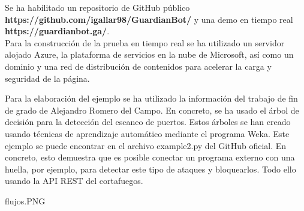 Se ha habilitado un repositorio de GitHub público \textbf{https://github.com/igallar98/GuardianBot/} y una demo en tiempo real \textbf{https://guardianbot.ga/}.
\\Para la construcción de la prueba en tiempo real se ha utilizado un servidor alojado Azure, la plataforma de servicios en la nube de Microsoft, así como un dominio y una red de distribución de contenidos para acelerar la carga y seguridad de la página. 

Para la elaboración del ejemplo se ha utilizado la información del trabajo de fin de grado de Alejandro Romero del Campo. En concreto, se ha usado el árbol de decisión para la detección del escaneo de puertos. Estos árboles se han creado usando técnicas de aprendizaje automático mediante el programa Weka. Este ejemplo se puede encontrar en el archivo example2.py del GitHub oficial. En concreto, esto demuestra que es posible conectar un programa externo con una huella, por ejemplo, para detectar este tipo de ataques y bloquearlos. Todo ello usando la API REST del cortafuegos.
\begin{center}
\begin{image}{}{}{flujos.PNG}
\end{image}
\end{center}
